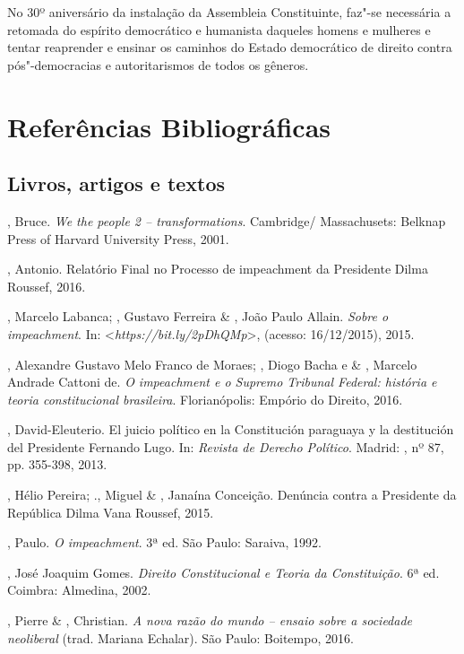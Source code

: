 No 30º aniversário da instalação da Assembleia Constituinte, faz"-se
necessária a retomada do espírito democrático e humanista daqueles
homens e mulheres e tentar reaprender e ensinar os caminhos do Estado
democrático de direito contra pós"-democracias e autoritarismos de todos
os gêneros.

\section{Referências Bibliográficas}

\subsection{Livros, artigos e textos}

\begin{Parskip}
, Bruce. \emph{We the people 2 -- transformations}.
Cambridge/ Massachusets: Belknap Press of Harvard University Press, 2001.

, Antonio. Relatório Final no Processo de impeachment da
Presidente Dilma Roussef, 2016.

, Marcelo Labanca; , Gustavo Ferreira \& , João
Paulo Allain. \emph{Sobre o impeachment}. In: \textless{}\emph{https://bit.ly/2pDhQMp}\textgreater{},
(acesso: 16/12/2015), 2015.

, Alexandre Gustavo Melo Franco de Moraes; , Diogo Bacha e \&
, Marcelo Andrade Cattoni de. \emph{O impeachment e o Supremo
Tribunal Federal: história e teoria constitucional brasileira}.
Florianópolis: Empório do Direito, 2016.

, David-Eleuterio. El juicio político en la Constitución
paraguaya y la destitución del Presidente Fernando Lugo. In:
\emph{Revista de Derecho Político}. Madrid: , nº 87, pp. 355-398,
2013.

, Hélio Pereira; ., Miguel \& , Janaína Conceição.
Denúncia contra a Presidente da República Dilma Vana Roussef, 2015.

, Paulo. \emph{O impeachment}. 3ª ed. São Paulo: Saraiva, 1992.

, José Joaquim Gomes. \emph{Direito Constitucional e Teoria da
Constituição}. 6ª ed. Coimbra: Almedina, 2002.

, Pierre \& , Christian. \emph{A nova razão do mundo -- ensaio
sobre a sociedade neoliberal} (trad. Mariana Echalar). São Paulo:
Boitempo, 2016.


\end{Parskip}
